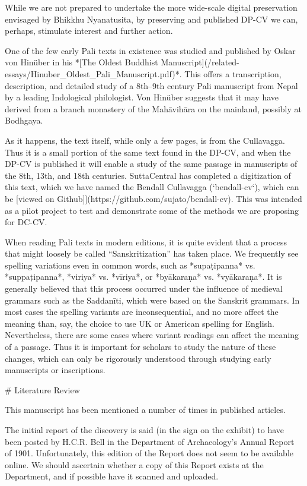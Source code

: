 \documentclass[11pt, openany,a5paper]{article}
\begin{document}
\begin{markdown}
While we are not prepared to undertake the more wide-scale digital preservation envisaged by Bhikkhu Nyanatusita, by preserving and published DP-CV we can, perhaps, stimulate interest and further action.

One of the few early Pali texts in existence was studied and published by Oskar von Hinüber in his *[The Oldest Buddhist Manuscript](/related-essays/Hinuber_Oldest_Pali_Manuscript.pdf)*. This offers a transcription, description, and detailed study of a 8th–9th century Pali manuscript from Nepal by a leading Indological philologist. Von Hinüber suggests that it may have derived from a branch monastery of the Mahāvihāra on the mainland, possibly at Bodhgaya.

As it happens, the text itself, while only a few pages, is from the Cullavagga. Thus it is a small portion of the same text found in the DP-CV, and when the DP-CV is published it will enable a study of the  same passage in manuscripts of the 8th, 13th, and 18th centuries. SuttaCentral has completed a digitization of this text, which we have named the Bendall Cullavagga (`bendall-cv`), which can be [viewed on Github]](https://github.com/sujato/bendall-cv). This was intended as a pilot project to test and demonstrate some of the methods we are proposing for DC-CV.

When reading Pali texts in modern editions, it is quite evident that a process that might loosely be called “Sanskritization” has taken place. We frequently see spelling variations even in common words, such as *supaṭipanna* vs. *suppaṭipanna*, *viriya* vs. *vīriya*, or *byākaraṇa* vs. *vyākaraṇa*. It is generally believed that this process occurred under the influence of medieval grammars such as the Saddanīti, which were based on the Sanskrit grammars. In most cases the spelling variants are inconsequential, and no more affect the meaning than, say, the choice to use UK or American spelling for English. Nevertheless, there are some cases where variant readings can affect the meaning of a passage. Thus it is important for scholars to study the nature of these changes, which can only be rigorously understood through studying early manuscripts or inscriptions.

# Literature Review

This manuscript has been mentioned a number of times in published articles.

The initial report of the discovery is said (in the sign on the exhibit) to have been posted by H.C.R. Bell in the Department of Archaeology’s Annual Report of 1901. Unfortunately, this edition of the Report does not seem to be available online. We should ascertain whether a copy of this Report exists at the Department, and if possible have it scanned and uploaded.


\end{markdown}
\end{document}
